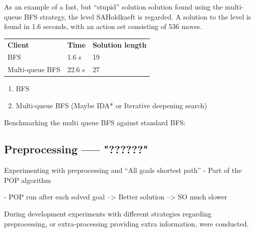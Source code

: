 \documentclass[Main]{subfiles}
\begin{document}
As an example of a fast, but ``stupid'' solution solution found using the multi-queue BFS strategy, the level SAHoldkaeft is regarded. A solution to the level is found in 1.6 seconds, with an action set consisting of 536 moves. 

\begin{table}[h]
\begin{tabular}{lll}
\rowcolor[HTML]{EFE} 
\textbf{Client} & \textbf{Time} & \textbf{Solution length} \\   %
BFS             & 1.6 s        & 19                       \\    %
Multi-queue BFS & 22.6 s       & 27                       \\    %
\end{tabular}
\end{table}






\begin{enumerate}
    \item BFS 
    \item Multi-queue BFS (Maybe IDA* or Iterative deepening search)
\end{enumerate}



Benchmarking the multi queue BFS against standard BFS:





\subsection{Preprocessing ----- "??????" }

Experimenting with preprocessing and ``All goals shortest path'' 
- Part of the POP algorithm

- POP run after each solved goal 
--> Better solution --> SO much slower


During development experiments with different strategies regarding preprocessing, or extra-processing providing extra information, were conducted. 
\end{document}
